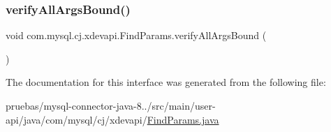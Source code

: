 \mbox{\label{interfacecom_1_1mysql_1_1cj_1_1xdevapi_1_1_find_params_a6837b83b1e100693a2db78f719f37f3c}} 
\subsubsection{\texorpdfstring{verify\+All\+Args\+Bound()}{verifyAllArgsBound()}}
{\footnotesize\ttfamily void com.\+mysql.\+cj.\+xdevapi.\+Find\+Params.\+verify\+All\+Args\+Bound (\begin{DoxyParamCaption}{ }\end{DoxyParamCaption})}



The documentation for this interface was generated from the following file\+:\begin{DoxyCompactItemize}
\item 
pruebas/mysql-\/connector-\/java-\/8../src/main/user-\/api/java/com/mysql/cj/xdevapi/\mbox{\hyperlink{_find_params_8java}{Find\+Params.\+java}}\end{DoxyCompactItemize}
